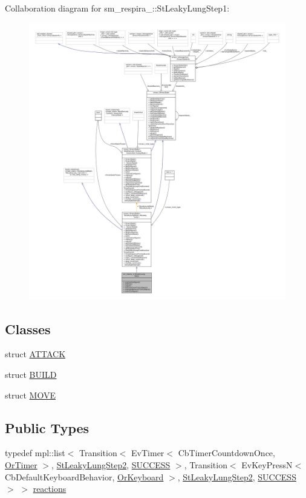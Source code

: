 Collaboration diagram for sm\+\_\+respira\+\_\+:\+:St\+Leaky\+Lung\+Step1\+:
\nopagebreak
\begin{figure}[H]
\begin{center}
\leavevmode
\includegraphics[width=350pt]{structsm__respira__1_1_1StLeakyLungStep1__coll__graph}
\end{center}
\end{figure}
\subsection*{Classes}
\begin{DoxyCompactItemize}
\item 
struct \hyperlink{structsm__respira__1_1_1StLeakyLungStep1_1_1ATTACK}{A\+T\+T\+A\+CK}
\item 
struct \hyperlink{structsm__respira__1_1_1StLeakyLungStep1_1_1BUILD}{B\+U\+I\+LD}
\item 
struct \hyperlink{structsm__respira__1_1_1StLeakyLungStep1_1_1MOVE}{M\+O\+VE}
\end{DoxyCompactItemize}
\subsection*{Public Types}
\begin{DoxyCompactItemize}
\item 
typedef mpl\+::list$<$ Transition$<$ Ev\+Timer$<$ Cb\+Timer\+Countdown\+Once, \hyperlink{classsm__respira__1_1_1OrTimer}{Or\+Timer} $>$, \hyperlink{structsm__respira__1_1_1StLeakyLungStep2}{St\+Leaky\+Lung\+Step2}, \hyperlink{classSUCCESS}{S\+U\+C\+C\+E\+SS} $>$, Transition$<$ Ev\+Key\+PressN$<$ Cb\+Default\+Keyboard\+Behavior, \hyperlink{classsm__respira__1_1_1OrKeyboard}{Or\+Keyboard} $>$, \hyperlink{structsm__respira__1_1_1StLeakyLungStep2}{St\+Leaky\+Lung\+Step2}, \hyperlink{classSUCCESS}{S\+U\+C\+C\+E\+SS} $>$ $>$ \hyperlink{structsm__respira__1_1_1StLeakyLungStep1_a952646a8bef57c53f04b06d0e74c1411}{reactions}
\end{DoxyCompactItemize}

